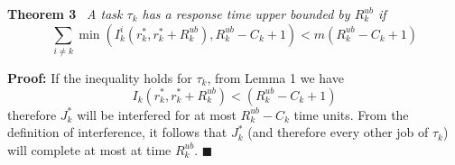 \textbf{Theorem 3} \ \textit{A task $\tau_k$ has a response time upper bounded by $R_k^{ub}$ if}
\[
\sum_{i \neq k} \min \left( I_k^i(r_k^*, r_k^* + R_k^{ub}), R_k^{ub} - C_k + 1 \right)
< m(R_k^{ub} - C_k + 1)
\]

\bigskip

\noindent
\textbf{Proof:} If the inequality holds for $\tau_k$, from Lemma 1 we have
\[
I_k(r_k^*, r_k^* + R_k^{ub}) < (R_k^{ub} - C_k + 1)
\]
therefore $J_k^*$ will be interfered for at most $R_k^{ub} - C_k$ time units. From the definition of interference, it follows that $J_k^*$ (and therefore every other job of $\tau_k$) will complete at most at time $R_k^{ub}$. \hfill $\blacksquare$